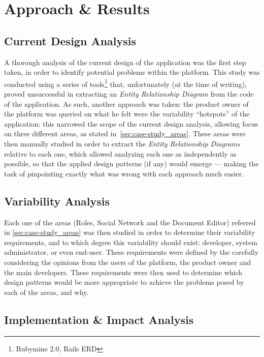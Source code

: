 \chapter{Approach \& Results}\label{chap:approach_results}

\section{Current Design Analysis}\label{sec:current_design_analysis}

A thorough analysis of the current design of the application was the first step taken, in order to identify potential problems within the platform. This study was conducted using a series of tools\footnote{Rubymine 2.0\cite{rubymine}, Rails ERD\cite{rails_erd}} that, unfortunately (at the time of writing), proved unsuccessful in extracting an \emph{Entity Relationship Diagram} from the code of the application. As such, another approach was taken: the product owner of the platform was queried on what he felt were the variability ``hotspots'' of the application: this narrowed the scope of the current design analysis, allowing focus on three different areas, as stated in~\ref{sec:case-study_areas}. These areas were then manually studied in order to extract the \emph{Entity Relationship Diagrams} relative to each one, which allowed analyzing each one as independently as possible, so that the applied design patterns (if any) would emerge --- making the task of pinpointing exactly what was wrong with each approach much easier.

\section{Variability Analysis}\label{sec:variability_analysis}

Each one of the areas (Roles, Social Network and the Document Editor) referred in \ref{sec:case-study_areas} was then studied in order to determine their variability requirements, and to which degree this variability should exist: developer, system administrator, or even end-user. These requirements were defined by the carefully considering the opinions from the users of the platform, the product owner and the main developers. These requirements were then used to determine which design patterns would be more appropriate to achieve the problems posed by each of the areas, and why.

\section{Implementation \& Impact Analysis}

